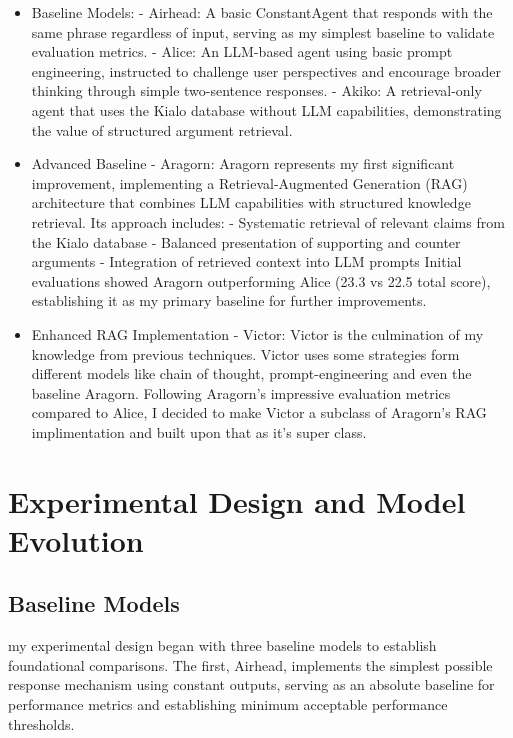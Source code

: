 \documentclass[11pt]{article}
\begin{document}
\begin{itemize}

\item Baseline Models:
- Airhead: A basic ConstantAgent that responds with the same phrase regardless of input, serving as my  simplest baseline to validate evaluation metrics.
- Alice: An LLM-based agent using basic prompt engineering, instructed to challenge user perspectives and encourage broader thinking through simple two-sentence responses.
- Akiko: A retrieval-only agent that uses the Kialo database without LLM capabilities, demonstrating the value of structured argument retrieval.

\item Advanced Baseline - Aragorn:
Aragorn represents my first significant improvement, implementing a Retrieval-Augmented Generation (RAG) architecture that combines LLM capabilities with structured knowledge retrieval. Its approach includes:
- Systematic retrieval of relevant claims from the Kialo database
- Balanced presentation of supporting and counter arguments
- Integration of retrieved context into LLM prompts
Initial evaluations showed Aragorn outperforming Alice (23.3 vs 22.5 total score), establishing it as my  primary baseline for further improvements.

\item Enhanced RAG Implementation - Victor:
Victor is the culmination of my knowledge from previous techniques. Victor uses some strategies form different models like chain of thought, prompt-engineering and even the baseline Aragorn. Following Aragorn's impressive evaluation metrics compared to Alice, I decided to make Victor a subclass of Aragorn's RAG implimentation and built upon that as it's super class.

\end{itemize}

\section{Experimental Design and Model Evolution}

\subsection{Baseline Models}
 my experimental design began with three baseline models to establish foundational comparisons. The first, Airhead, implements the simplest possible response mechanism using constant outputs, serving as an absolute baseline for performance metrics and establishing minimum acceptable performance thresholds.
\end{document}

